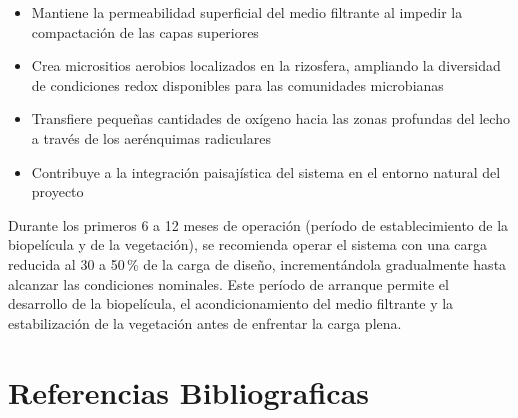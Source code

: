 \documentclass[12pt,a4paper]{article}
\begin{document}
\begin{itemize}[noitemsep,leftmargin=2em]
    \item Mantiene la permeabilidad superficial del medio filtrante al impedir la compactación de las capas superiores
    \item Crea micrositios aerobios localizados en la rizosfera, ampliando la diversidad de condiciones redox disponibles para las comunidades microbianas
    \item Transfiere pequeñas cantidades de oxígeno hacia las zonas profundas del lecho a través de los aerénquimas radiculares
    \item Contribuye a la integración paisajística del sistema en el entorno natural del proyecto
\end{itemize}

Durante los primeros 6 a 12 meses de operación (período de establecimiento de la biopelícula y de la vegetación), se recomienda operar el sistema con una carga reducida al 30 a 50\,\% de la carga de diseño, incrementándola gradualmente hasta alcanzar las condiciones nominales. Este período de arranque permite el desarrollo de la biopelícula, el acondicionamiento del medio filtrante y la estabilización de la vegetación antes de enfrentar la carga plena.



\newpage
\section{Referencias Bibliograficas}


\end{document}
